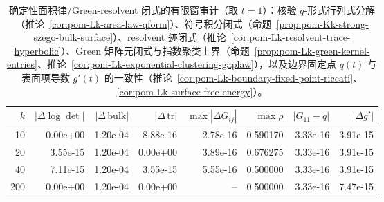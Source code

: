 \begin{table}[H]
\centering
\scriptsize
\setlength{\tabcolsep}{6pt}
\caption{确定性面积律/Green-resolvent 闭式的有限窗审计（取 $t=1$）：核验 $q$-形式行列式分解（推论~\ref{cor:pom-Lk-area-law-qform}）、符号积分闭式（命题~\ref{prop:pom-Kk-strong-szego-bulk-surface}）、resolvent 迹闭式（推论~\ref{cor:pom-Lk-resolvent-trace-hyperbolic}）、Green 矩阵元闭式与指数聚类上界（命题~\ref{prop:pom-Lk-green-kernel-entries}、推论~\ref{cor:pom-Lk-exponential-clustering-gaplaw}），以及边界固定点 $q(t)$ 与表面项导数 $g'(t)$ 的一致性（推论~\ref{cor:pom-Lk-boundary-fixed-point-riccati}、\ref{cor:pom-Lk-surface-free-energy}）。}
\label{tab:fence_green_kernel_area_law_resolvent_audit}
\begin{tabular}{r r r r r r r r}
\toprule
$k$ & $|\Delta\log\det|$ & $|\Delta\,\mathrm{bulk}|$ & $|\Delta\,\mathrm{tr}|$ & $\max|\Delta G_{ij}|$ & $\max\rho$ & $|G_{11}-q|$ & $|\Delta g'|$\\
\midrule
10 & 0.00e+00 & 1.20e-04 & 8.88e-16 & 2.78e-16 & 0.590170 & 3.33e-16 & 3.91e-15\\
20 & 3.55e-15 & 1.20e-04 & 0.00e+00 & 3.89e-16 & 0.676275 & 3.33e-16 & 3.91e-15\\
40 & 7.11e-15 & 1.20e-04 & 3.55e-15 & 5.55e-16 & 0.500000 & 3.33e-16 & 3.91e-15\\
200 & 0.00e+00 & 1.20e-04 & 0.00e+00 & -- & 0.500000 & 3.33e-16 & 7.47e-15\\
\bottomrule
\end{tabular}
\end{table}
